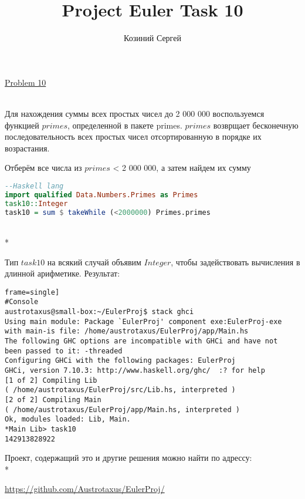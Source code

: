 \documentclass[11pt,a4paper]{article}
\title{Project Euler Task 10}
\author{Козиний Сергей}
\begin{document}
    
\maketitle
\href{''https://projecteuler.net/problem=10''}{Problem 10}

\\

Для нахождения суммы всех простых чисел до 2 000 000 воспользуемся функцией $primes$, определенной в пакете primes.
$primes$ возврщает бесконечную последовательность всех простых чисел отсортированную в порядке их возрастания.

Отберём все числа из $primes$ < 2 000 000, а затем найдем их сумму
\begin{lstlisting}[language=Haskell, frame=single]
--Haskell lang
import qualified Data.Numbers.Primes as Primes
task10::Integer
task10 = sum $ takeWhile (<2000000) Primes.primes
\end{lstlisting} \\*

Тип $task10$ на всякий случай объявим $Integer$, чтобы задействовать вычисления в длинной арифметике.
Результат:
\begin{lstlisting}frame=single]
#Console
austrotaxus@small-box:~/EulerProj$ stack ghci
Using main module: Package `EulerProj' component exe:EulerProj-exe
with main-is file: /home/austrotaxus/EulerProj/app/Main.hs
The following GHC options are incompatible with GHCi and have not
been passed to it: -threaded
Configuring GHCi with the following packages: EulerProj
GHCi, version 7.10.3: http://www.haskell.org/ghc/  :? for help
[1 of 2] Compiling Lib
( /home/austrotaxus/EulerProj/src/Lib.hs, interpreted )
[2 of 2] Compiling Main
( /home/austrotaxus/EulerProj/app/Main.hs, interpreted )
Ok, modules loaded: Lib, Main. 
*Main Lib> task10
142913828922
\end{lstlisting}

Проект, содержащий это и другие решения можно найти по адрессу:\\*

\url{https://github.com/Austrotaxus/EulerProj/}
\end{document}
